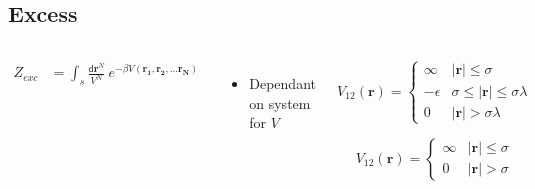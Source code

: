 \documentclass{beamer}
\newcommand*{\diff}{\mathsf{d}}
\renewcommand{\vec}[1]{\mathbf{#1}}
\begin{document}
\subsection*{Excess}
\begin{frame}
	\begin{columns}		
			\begin{align*}
				Z_{exc} &= \int_s \frac{\diff\mathbf{r}^N}{V^N} ~e^{-\beta V(\mathbf{r_1}, \mathbf{r_2}, \dots \mathbf{r_N})}
			\end{align*}
			\begin{itemize}
				\item Dependant on system for $V$
			\end{itemize}
		\begin{description}[noitemsep, leftmargin=*]
			\item[Square Well] \begin{equation*} 
				V_{12}(\mathbf r) = \begin{cases}\infty & |\vec{r}|\leq \sigma\\ -\epsilon & \sigma \leq |\vec{r}| \leq \sigma\lambda\\ 0 & |\vec{r}| > \sigma\lambda \end{cases}
				\label{phi12_sw}
				\end{equation*}
			\item[Hard Sphere] \begin{equation*} 
				V_{12}(\mathbf r) = \begin{cases}\infty & |\vec{r}|\leq \sigma\\  0 & |\vec{r}| > \sigma \end{cases}
				\label{phi12_hs}
				\end{equation*}
		\end{description}
	\end{columns}
\end{frame}
\end{document}
